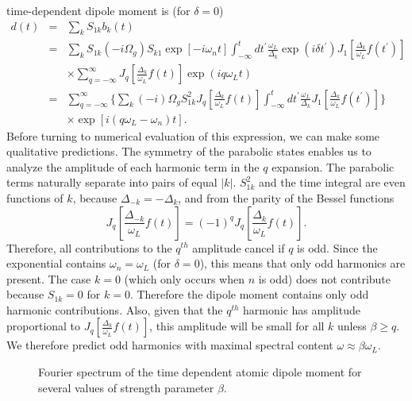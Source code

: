 time-dependent dipole moment is (for $\delta =0$)
\begin{eqnarray}
d(t) &=& \sum_k S_{1k} b_k(t) \nonumber \\
     &=& \sum_k S_{1k} (-i \Omega_g) S_{k1} \exp \left[-i\omega_n t 
\right] \int_{-\infty}^{t} dt^{'} \frac{\omega_L}{\Delta_k}
\exp \left(i \delta t^{'}\right) J_{1} \left[\frac{\Delta_k}{\omega_L}
f\left(t^{'}\right)
\right] \nonumber \\
&& \times \sum_{q= -\infty}^{\infty}
J_q\left[\frac{\Delta_k}{\omega_L} f(t)\right] \exp(iq\omega_L t)
\nonumber \\
&=& \sum_{q=-\infty}^{\infty}\Biggl\{ \sum_k (-i) \Omega_g S_{1k}^2
J_q\left[\frac{\Delta_k}{\omega_L} f(t)\right]
\int_{-\infty}^{t} dt^{'} \frac{\omega_L}{\Delta_k}
 J_{1} \left[\frac{\Delta_k}{\omega_L}
f\left(t^{'}\right) \right] \Biggr\} \nonumber \\
&& \times  \exp\left[i(q\omega_L-\omega_n)t\right]. \label{eq:harmonics2}
\end{eqnarray}
Before turning to numerical evaluation of this expression, we can make some
qualitative predictions.  The symmetry of the parabolic states
enables us to analyze the amplitude of each harmonic term in the $q$
expansion.  The parabolic terms naturally separate into pairs of equal
$\left|k\right|$.
$S_{1k}^2$ and the time integral are even functions of $k$,
because $\Delta_{-k}=-\Delta_{k}$, and from the parity of the Bessel functions
\begin{equation}
J_q\left[\frac{\Delta_{-k}}{\omega_L} f(t)\right] =
(-1)^{q} J_q\left[\frac{\Delta_{k}}{\omega_L} f(t)\right].
\end{equation}
Therefore, all contributions to the $q^{th}$ amplitude cancel if $q$ is odd. 
Since the exponential contains $\omega_n = \omega_L$ (for $\delta=0$), this
means that only odd harmonics are present.  The case $k=0$ (which only occurs
when $n$ is odd) does not contribute because $S_{1k}=0$ for $k=0$.  Therefore
the dipole moment contains only odd harmonic contributions.  Also, given that the
$q^{th}$ harmonic has amplitude proportional to
$J_q\left[\frac{\Delta_k}{\omega_L} f(t)\right]$, this amplitude will be small
for all $k$ unless $\beta \geq q$.  We therefore predict odd harmonics with
maximal spectral content $\omega \approx \beta \omega_L$.

\begin{figure}[tbp]
\bigskip
{} {Fourier spectrum of the time dependent
atomic dipole moment for several values of strength parameter
$\beta$.
\label{fig:harmonics}}
\end{figure}


